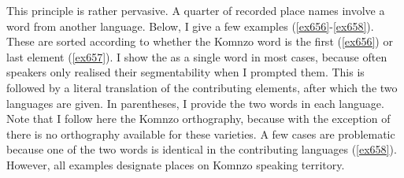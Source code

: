 This principle is rather pervasive. A quarter of recorded place names involve a word from another language. Below, I give a few examples (\ref{ex656}-\ref{ex658}). These are sorted according to whether the Komnzo word is the first (\ref{ex656}) or last element (\ref{ex657}). I show the  as a single word in most cases, because often speakers only realised their segmentability when I prompted them. This is followed by a literal  translation of the contributing elements, after which the two languages are given. In parentheses, I provide the two words in each language. Note that I follow here the Komnzo orthography, because with the exception of  there is no orthography available for these varieties. A few cases are problematic because one of the two words is identical in the contributing languages (\ref{ex658}). However, all examples designate places on Komnzo speaking territory.

